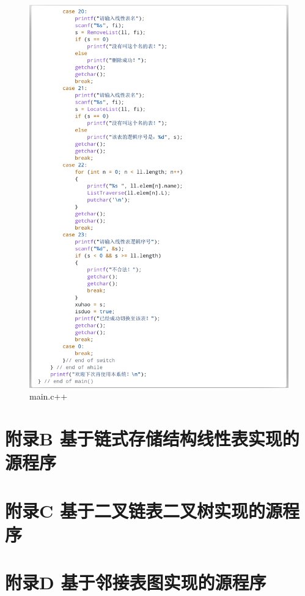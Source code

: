 \documentclass[supercite]{Experimental_Report}
\theoremstyle{definition}
\begin{document}
\begin{figure}[htb]
	\begin{center}
		\includegraphics[scale=0.30]{images/3-16.png}
		\caption{main.c++}
		\label{fig3-16}
	\end{center}
\end{figure}

\newpage
\section{附录B 基于链式存储结构线性表实现的源程序}
\newpage
\section{附录C 基于二叉链表二叉树实现的源程序}
\newpage
\section{附录D 基于邻接表图实现的源程序}
\end{document}
